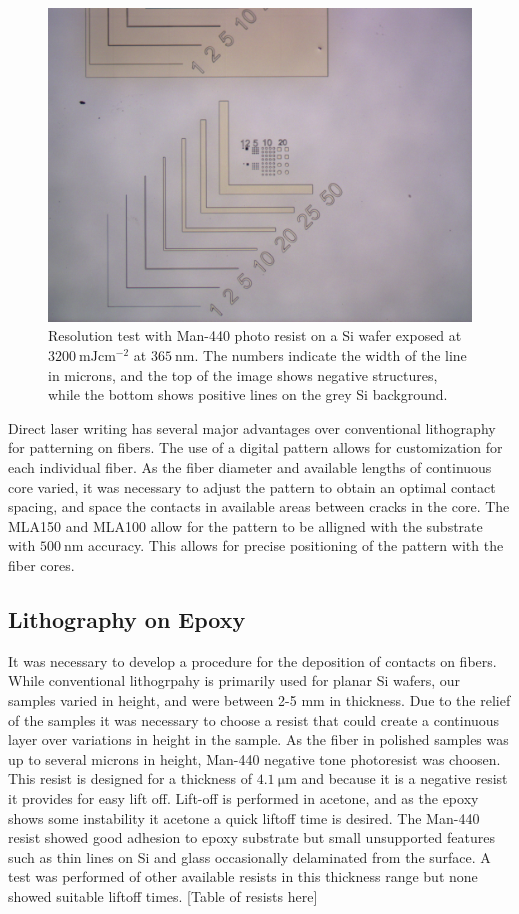 \begin{figure}[!htb]
    \centering
    \includegraphics[width=\textwidth]{fig/Results/resolution_test.jpg}
    \caption{Resolution test with Man-440 photo resist on a Si wafer exposed at  $\SI{3200}{\milli \joule \cm^{-2}}$ at $\SI{365}{\nm}$. The numbers indicate the width of the line in microns, and the top of the image shows negative structures, while the bottom shows positive lines on the grey Si background.}
    \label{fig:resolution_test}
\end{figure}

Direct laser writing has several major advantages over conventional lithography for patterning on fibers. The use of a digital pattern allows for customization for each individual fiber. As the fiber diameter and available lengths of continuous core varied, it was necessary to adjust the pattern to obtain an optimal contact spacing, and space the contacts in available areas between cracks in the core. The MLA150 and MLA100 allow for the pattern to be alligned with the substrate with $\SI{500}{\nm}$ accuracy. This allows for precise positioning of the pattern with the fiber cores. 

\subsection{Lithography on Epoxy}
It was necessary to develop a procedure for the deposition of contacts on fibers. While conventional lithogrpahy is primarily used for planar Si wafers, our samples varied in height, and were between 2-5 mm in thickness. Due to the relief of the samples it was necessary to choose a resist that could create a continuous layer over variations in height in the sample. As the fiber in polished samples was up to several microns in height, Man-440 negative tone photoresist was choosen. This resist is designed for a thickness of $\SI{4.1}{\micro \meter}$ and because it is a negative resist it provides for easy lift off. Lift-off is performed in acetone, and as the epoxy shows some instability it acetone a quick liftoff time is desired. The Man-440 resist showed good adhesion to epoxy substrate but small unsupported features such as thin lines on Si and glass occasionally delaminated from the surface. A test was performed of other available resists in this thickness range but none showed suitable liftoff times. [Table of resists here] 
